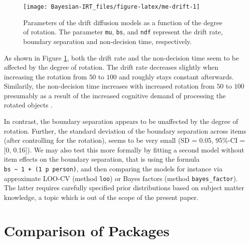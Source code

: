 \documentclass[jss]{jss}
\begin{document}
\begin{CodeChunk}
\begin{figure}

{\centering \texttt{[image: Bayesian-IRT\_files/figure-latex/me-drift-1]} 

}

\caption[Parameters of the drift diffusion models as a function of the degree of rotation]{Parameters of the drift diffusion models as a function of the degree of rotation. The parameter \texttt{mu}, \texttt{bs}, and \texttt{ndf} represent the drift rate, boundary separation and non-decision time, respectively.}\label{fig:me-drift}
\end{figure}
\end{CodeChunk}

As shown in Figure \ref{fig:me-drift}, both the drift rate and the
non-decision time seem to be affected by the degree of rotation. The
drift rate decreases slightly when increasing the rotation from \(50\)
to \(100\) and roughly stays constant afterwards. Similarily, the
non-decision time increases with increased rotation from \(50\) to
\(100\) presumably as a result of the increased cognitive demand of
processing the rotated objects \citep{diffIRT}.

In contrast, the boundary separation appears to be unaffected by the
degree of rotation. Further, the standard deviation of the boundary
separation across items (after controlling for the rotation), seems to
be very small (SD = 0.05, 95\%-CI = {[}0, 0.16{]}). We may also test
this more formally by fitting a second model without item effects on the
boundary separation, that is using the formula
\texttt{bs\ \textasciitilde{}\ 1\ +\ (1\ \textbar{}p\textbar{}\ person)},
and then comparing the models for instance via approximate LOO-CV
(method \texttt{loo}) or Bayes factors (method \texttt{bayes\_factor}).
The latter requires carefully specified prior distributions based on
subject matter knowledge, a topic which is out of the scope of the
present paper.

\hypertarget{comparison}{%
\section{Comparison of Packages}\label{comparison}}
\end{document}
